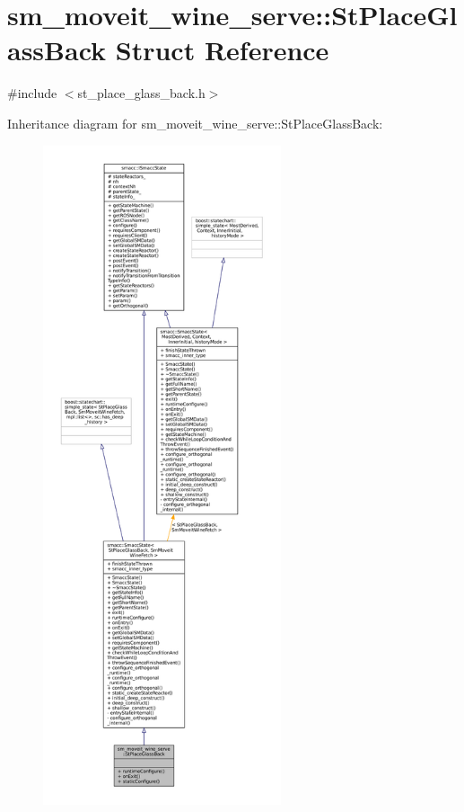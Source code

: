\hypertarget{structsm__moveit__wine__serve_1_1StPlaceGlassBack}{}\section{sm\+\_\+moveit\+\_\+wine\+\_\+serve\+:\+:St\+Place\+Glass\+Back Struct Reference}
\label{structsm__moveit__wine__serve_1_1StPlaceGlassBack}


{\ttfamily \#include $<$st\+\_\+place\+\_\+glass\+\_\+back.\+h$>$}



Inheritance diagram for sm\+\_\+moveit\+\_\+wine\+\_\+serve\+:\+:St\+Place\+Glass\+Back\+:
\nopagebreak
\begin{figure}[H]
\begin{center}
\leavevmode
\includegraphics[height=550pt]{structsm__moveit__wine__serve_1_1StPlaceGlassBack__inherit__graph}
\end{center}
\end{figure}


